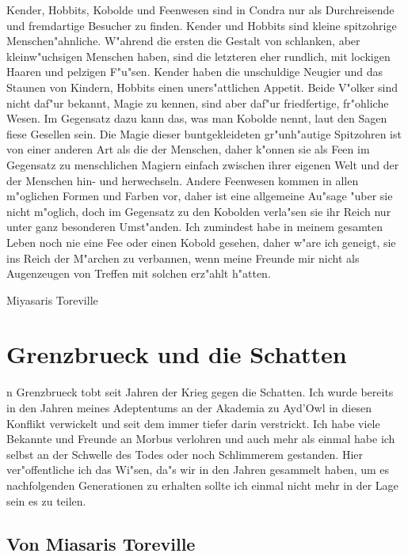 \documentclass[a5paper,8pt]{book}
\begin{document}
Kender, Hobbits, Kobolde und Feenwesen sind in Condra nur als Durchreisende und fremdartige Besucher zu finden. Kender und Hobbits sind kleine spitzohrige Menschen"ahnliche. W"ahrend die ersten die Gestalt von schlanken, aber kleinw"uchsigen Menschen haben, sind die letzteren eher rundlich, mit lockigen Haaren und pelzigen F"u"sen. Kender haben die unschuldige Neugier und das Staunen von Kindern, Hobbits einen uners"attlichen Appetit. Beide V"olker sind nicht daf"ur bekannt, Magie zu kennen, sind aber daf"ur friedfertige, fr"ohliche Wesen. 
Im Gegensatz dazu kann das, was man Kobolde nennt, laut den Sagen fiese Gesellen sein. Die Magie dieser buntgekleideten gr"unh"autige Spitzohren ist von einer anderen Art als die der Menschen, daher k"onnen sie als Feen im Gegensatz zu menschlichen Magiern einfach zwischen ihrer eigenen Welt und der der Menschen hin- und herwechseln. Andere Feenwesen kommen in allen m"oglichen Formen und Farben vor, daher ist  eine allgemeine Au"sage "uber sie nicht m"oglich, doch im Gegensatz zu den Kobolden verla"sen sie ihr Reich nur unter ganz besonderen Umst"anden. Ich zumindest habe in meinem gesamten Leben noch nie eine Fee oder einen Kobold gesehen, daher w"are ich geneigt, sie ins Reich der M"archen zu verbannen, wenn meine Freunde mir nicht als Augenzeugen von Treffen mit solchen erz"ahlt h"atten. 

\vspace{10mm}

Miyasaris Toreville

\newpage

\chapter{Grenzbrueck und die Schatten}

n Grenzbrueck tobt seit Jahren der Krieg gegen die Schatten. Ich wurde bereits in den Jahren meines Adeptentums an der Akademia zu Ayd'Owl in diesen Konflikt verwickelt und seit dem immer tiefer darin verstrickt. Ich habe viele Bekannte und Freunde an Morbus verlohren und auch mehr als einmal habe ich selbst an der Schwelle des Todes oder noch Schlimmerem gestanden. Hier ver"offentliche ich das Wi"sen, da"s wir in den Jahren gesammelt haben, um es nachfolgenden Generationen zu erhalten sollte ich einmal nicht mehr in der Lage sein es zu teilen.


\section{ Von Miasaris Toreville}
\end{document}
